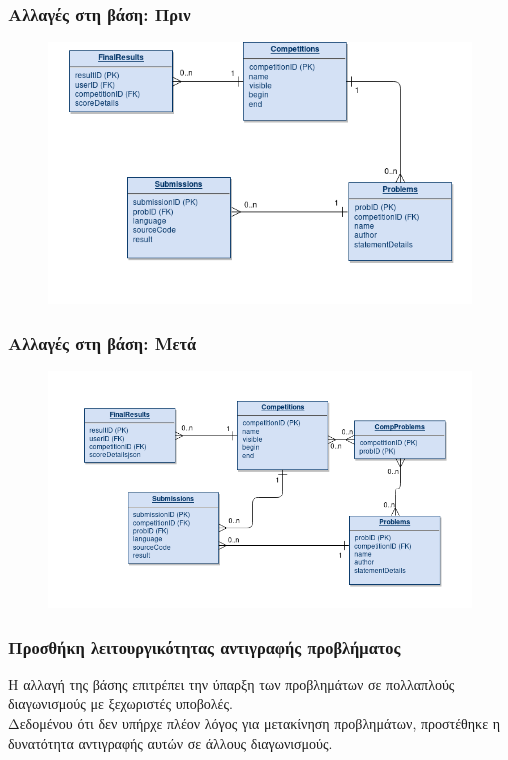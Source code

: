 \documentclass{beamer}
\begin{document}
\begin{frame}
  \frametitle{Αλλαγές στη βάση: Πριν}
  

  \begin{figure}

    \includegraphics[scale=0.4,trim=4 4 4 4,clip]{../Figures/sepbefore.png}
  \end{figure}
  
\end{frame}

\begin{frame}
  \frametitle{Αλλαγές στη βάση: Μετά}

  \begin{figure}
    \includegraphics[scale=0.4,trim=4 4 4 4,clip]{../Figures/sepafter.png}
  \end{figure}
  
\end{frame}

\begin{frame}
  \frametitle{Προσθήκη λειτουργικότητας αντιγραφής προβλήματος}

  Η αλλαγή της βάσης επιτρέπει την ύπαρξη των προβλημάτων σε πολλαπλούς διαγωνισμούς
  με ξεχωριστές υποβολές. \\[0.3cm]
  
  Δεδομένου ότι δεν υπήρχε πλέον λόγος για μετακίνηση προβλημάτων, προστέθηκε η
  δυνατότητα αντιγραφής αυτών σε άλλους διαγωνισμούς.
\end{frame}
\end{document}
